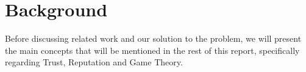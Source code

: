 \section{Background}
\label{sec:Background}



Before discussing related work and our solution to the problem, we will present the main concepts that  will be mentioned in the rest of this report, specifically regarding Trust, Reputation and Game Theory.

